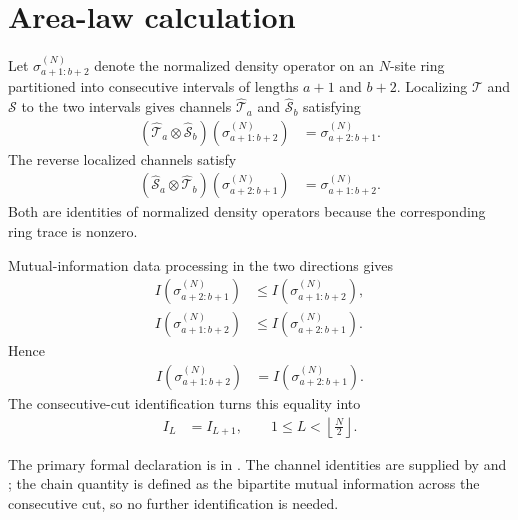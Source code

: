 \documentclass{article}
\begin{document}
\section{Area-law calculation}

Let $\sigma^{(N)}_{a+1:b+2}$ denote the normalized density operator on an
$N$-site ring partitioned into consecutive intervals of lengths $a+1$ and
$b+2$. Localizing $\mathcal T$ and $\mathcal S$ to the two intervals gives
channels $\widehat{\mathcal T}_a$ and $\widehat{\mathcal S}_b$ satisfying
\begin{align}
    (\widehat{\mathcal T}_a\otimes\widehat{\mathcal S}_b)
    (\sigma^{(N)}_{a+1:b+2})
        &=
        \sigma^{(N)}_{a+2:b+1}.
    \label{eq:cpsv16_rfp_sal_data_processing_forward_bipartition_channel}
\end{align}
The reverse localized channels satisfy
\begin{align}
    (\widehat{\mathcal S}_a\otimes\widehat{\mathcal T}_b)
    (\sigma^{(N)}_{a+2:b+1})
        &=
        \sigma^{(N)}_{a+1:b+2}.
    \label{eq:cpsv16_rfp_sal_data_processing_reverse_bipartition_channel}
\end{align}
Both are identities of normalized density operators because the corresponding
ring trace is nonzero.

Mutual-information data processing in the two directions gives
\begin{align}
    I(\sigma^{(N)}_{a+2:b+1})
        &\leq
        I(\sigma^{(N)}_{a+1:b+2}),
    \label{eq:cpsv16_rfp_sal_data_processing_forward_mutual_information}\\
    I(\sigma^{(N)}_{a+1:b+2})
        &\leq
        I(\sigma^{(N)}_{a+2:b+1}).
    \label{eq:cpsv16_rfp_sal_data_processing_reverse_mutual_information}
\end{align}
Hence
\begin{align}
    I(\sigma^{(N)}_{a+1:b+2})
        &=
        I(\sigma^{(N)}_{a+2:b+1}).
    \label{eq:cpsv16_rfp_sal_data_processing_mutual_information_equality}
\end{align}
The consecutive-cut identification turns this equality into
\begin{align}
    I_L
        &=
        I_{L+1},
        \qquad
        1\leq L<\left\lfloor\frac{N}{2}\right\rfloor.
    \label{eq:cpsv16_rfp_sal_data_processing_area_law_saturation}
\end{align}

The primary formal declaration is
 in
. The channel identities are supplied by
 and
; the chain
quantity  is defined as the bipartite mutual
information across the consecutive cut, so no further identification is needed.
\end{document}
